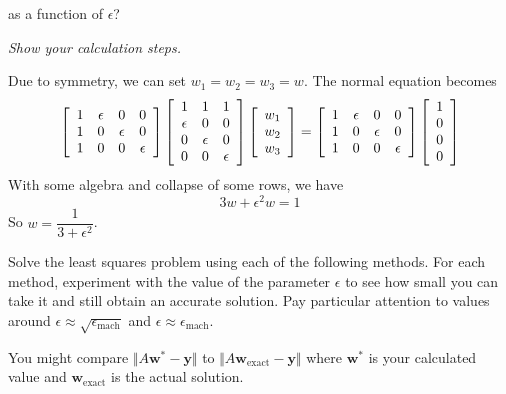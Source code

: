 \documentclass[12pt,letterpaper,answers]{exam}
\newcommand{\vc}[1]{\boldsymbol{#1}}
\begin{document}
\begin{questions}
as a function of $\epsilon$?

\emph{Show your calculation steps.}

\begin{solution}
    Due to symmetry, we can set $w_1=w_2=w_3=w$. The normal equation becomes
    \[
    \left[\begin{array}{c c c c} 
    1 & \epsilon & 0 & 0\\
    1 & 0 & \epsilon & 0\\
    1 & 0 & 0 & \epsilon\\
    \end{array}\right]
    \left[\begin{array}{c c c} 
    1 & 1& 1\\
    \epsilon & 0 & 0 \\
     0 & \epsilon &0 \\
     0 & 0 & \epsilon \\
    \end{array}\right]
    \left[\begin{array}{c} 
    w_1 \\ w_2 \\ w_3
    \end{array}\right] = \left[\begin{array}{c c c c} 
    1 & \epsilon & 0 & 0\\
    1 & 0 & \epsilon & 0\\
    1 & 0 & 0 & \epsilon\\
    \end{array}\right]
    \left[\begin{array}{c} 
    1 \\ 0 \\ 0 \\ 0
    \end{array}\right]
    \]
    With some algebra and collapse of some rows, we have $$3w+\epsilon^2w=1$$
    So $w=\dfrac{1}{3+\epsilon^2}$.
\end{solution}

Solve the least squares problem using each of the following methods.  For each method, experiment with the value of the parameter $\epsilon$ to see how small you can take it and still obtain an accurate solution.  Pay particular attention to values around $\epsilon \approx \sqrt{\epsilon_{\text{mach}}}$ and $\epsilon \approx \epsilon_{\text{mach}}$.

You might compare $\Vert A\vc{w}^* - \vc{y}\Vert$ to $\Vert A\vc{w}_{\text{exact}} - \vc{y}\Vert$ where $\vc{w}^*$ is your calculated value and $\vc{w}_{\text{exact}}$ is the actual solution.


\end{questions}
\end{document}
